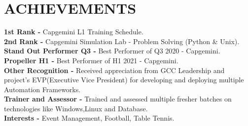 \documentclass[letterpaper,11pt]{article}
\begin{document}
\section{ACHIEVEMENTS}
 \begin{itemize}[leftmargin=0in, label={}]
    \small{\item{
    \textbf{1st Rank -} {Capgemini L1 Training Schedule.} \vspace{2pt} \\
    \textbf{2nd Rank -} {Capgemini Simulation Lab - Problem Solving (Python \& Unix).} \vspace{2pt} \\
    \textbf{Stand Out Performer Q3 -} {Best Performer of Q3 2020 - Capgemini.} \vspace{2pt} \\
    \textbf{Propeller H1 -} {Best Performer of H1 2021 - Capgemini.} \vspace{2pt} \\
    \textbf{Other Recognition -} {Received appreciation from GCC Leadership and project's EVP(Executive Vice President) for developing and deploying multiple Automation Frameworks.} \vspace{2pt} \\
    \textbf{Trainer and Assessor -} {Trained and assessed multiple fresher batches on technologies like Windows,Linux and Database.} \vspace{2pt} \\
    \textbf{Interests -} {Event Management, Football, Table Tennis.} \vspace{2pt} \\
    }
    }
 \end{itemize}
\end{document}
